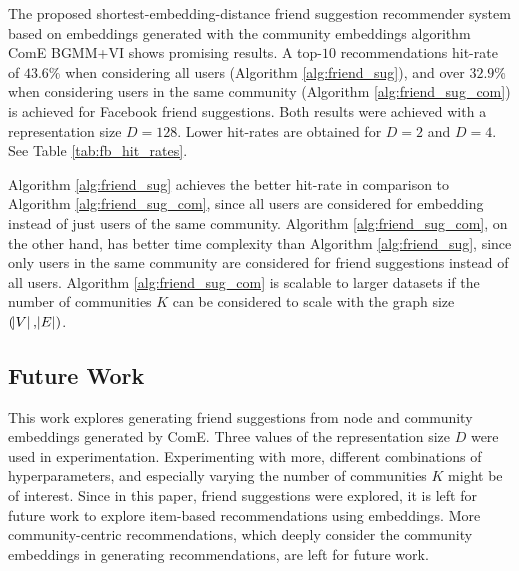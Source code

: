 \documentclass[conference]{IEEEtran}
\begin{document}
The proposed shortest-embedding-distance friend suggestion recommender system based on embeddings generated with the community embeddings algorithm ComE BGMM+VI shows promising results.
A top-$10$ recommendations hit-rate of $43.6\%$ when considering all users (Algorithm \ref{alg:friend_sug}), and over $32.9\%$ when considering users in the same community (Algorithm \ref{alg:friend_sug_com}) is achieved for Facebook friend suggestions. Both results were achieved with a representation size $D=128$. Lower hit-rates are obtained for $D=2$ and $D=4$. See Table \ref{tab:fb_hit_rates}.

Algorithm \ref{alg:friend_sug} achieves the better hit-rate in comparison to Algorithm \ref{alg:friend_sug_com}, since all users are considered for embedding instead of just users of the same community. Algorithm \ref{alg:friend_sug_com}, on the other hand, has better time complexity than Algorithm \ref{alg:friend_sug}, since only users in the same community are considered for friend suggestions instead of all users. Algorithm \ref{alg:friend_sug_com} is scalable to larger datasets if the number of communities $K$ can be considered to scale with the graph size $(\abs{V}, \abs{E})$.

\subsection{Future Work}

This work explores generating friend suggestions from node and community embeddings generated by ComE. Three values of the representation size $D$ were used in experimentation. Experimenting with more, different combinations of hyperparameters, and especially varying the number of communities $K$ might be of interest. Since in this paper, friend suggestions were explored, it is left for future work to explore item-based recommendations using embeddings. More community-centric recommendations, which deeply consider the community embeddings in generating recommendations, are left for future work.




\end{document}
